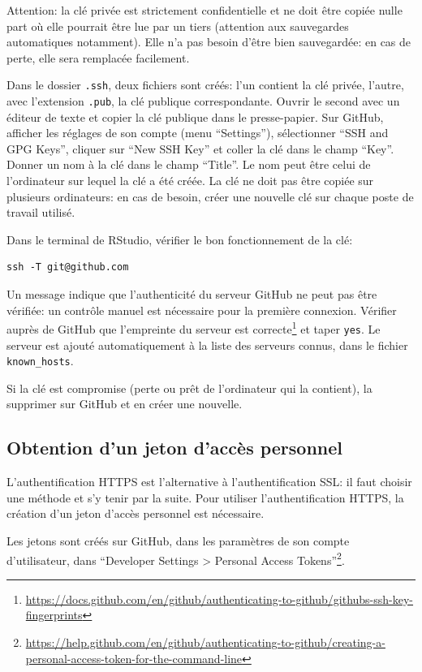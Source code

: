 \documentclass[
  12pt,
  french,
  a4paper,
  extrafontsizes,onecolumn,openright
  ]{memoir}
\begin{document}
Attention: la clé privée est strictement confidentielle et ne doit être copiée nulle part où elle pourrait être lue par un tiers (attention aux sauvegardes automatiques notamment).
Elle n'a pas besoin d'être bien sauvegardée: en cas de perte, elle sera remplacée facilement.

Dans le dossier \texttt{.ssh}, deux fichiers sont créés: l'un contient la clé privée, l'autre, avec l'extension \texttt{.pub}, la clé publique correspondante.
Ouvrir le second avec un éditeur de texte et copier la clé publique dans le presse-papier.
Sur GitHub, afficher les réglages de son compte (menu \enquote{Settings}), sélectionner \enquote{SSH and GPG Keys}, cliquer sur \enquote{New SSH Key} et coller la clé dans le champ \enquote{Key}.
Donner un nom à la clé dans le champ \enquote{Title}.
Le nom peut être celui de l'ordinateur sur lequel la clé a été créée.
La clé ne doit pas être copiée sur plusieurs ordinateurs: en cas de besoin, créer une nouvelle clé sur chaque poste de travail utilisé.

Dans le terminal de RStudio, vérifier le bon fonctionnement de la clé:

\begin{verbatim}
ssh -T git@github.com
\end{verbatim}

Un message indique que l'authenticité du serveur GitHub ne peut pas être vérifiée: un contrôle manuel est nécessaire pour la première connexion.
Vérifier auprès de GitHub que l'empreinte du serveur est correcte\footnote{\url{https://docs.github.com/en/github/authenticating-to-github/githubs-ssh-key-fingerprints}} et taper \texttt{yes}.
Le serveur est ajouté automatiquement à la liste des serveurs connus, dans le fichier \texttt{known\_hosts}.

Si la clé est compromise (perte ou prêt de l'ordinateur qui la contient), la supprimer sur GitHub et en créer une nouvelle.

\hypertarget{sec:pat}{%
\subsection{Obtention d'un jeton d'accès personnel}\label{sec:pat}}

L'authentification HTTPS est l'alternative à l'authentification SSL: il faut choisir une méthode et s'y tenir par la suite.
Pour utiliser l'authentification HTTPS, la création d'un jeton d'accès personnel est nécessaire.

Les jetons sont créés sur GitHub, dans les paramètres de son compte d'utilisateur, dans \enquote{Developer Settings \textgreater{} Personal Access Tokens}\footnote{\url{https://help.github.com/en/github/authenticating-to-github/creating-a-personal-access-token-for-the-command-line}}.
\end{document}
